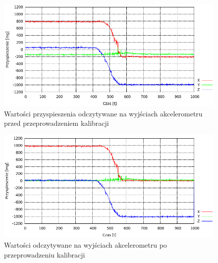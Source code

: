 \begin{figure}[h!]
 \centering \includegraphics[width=\textwidth]{../images/ch04/raw_acc_data.png}
 \caption{Wartości przyspieszenia odczytywane na wyjściach akcelerometru przed
 przeprowadzeniem kalibracji}
 \label{fig:MMADataRaw}
\end{figure}
  
\begin{figure}[h!]
 \centering \includegraphics[width=\textwidth]{../images/ch04/calib_acc_data.png}
 \caption{Wartości odczytywane na wyjściach akcelerometru po przeprowadzeniu kalibracji}
 \label{fig:MMADataCalib}
\end{figure}